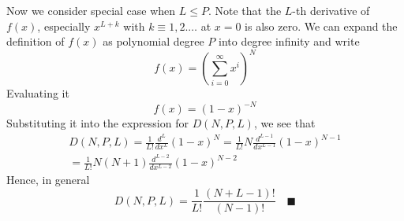 \documentclass[../../main.tex]{subfiles}
\begin{document}
Now we consider special case when $L\leq P$. Note that the $L$-th derivative of $f(x) $, especially $x^{L+k}$ with $k\equiv 1,2.\dots$ at $x=0$ is also zero. We can expand the definition of $f(x)$ as polynomial degree $P$ into degree infinity and write
\begin{equation*}
    f(x)=\left(\sum^{\infty}_{i=0}x^i\right)^N
\end{equation*}
Evaluating it
\begin{equation*}
    f(x)=(1-x)^{-N}
\end{equation*}
Substituting it into the expression for $D(N,P,L)$, we see that 
\begin{multline*}
    D(N,P,L)=\frac{1}{L!}\frac{d^L}{dx^L}(1-x)^N =\frac{1}{L!}N\frac{d^{L-1}}{dx^{L-1}}(1-x)^{N-1}\\ =\frac{1}{L!} N(N+1) \frac{d^{L-2}}{dx^{L-2}}(1-x)^{N-2}
\end{multline*}
Hence, in general
\begin{equation*}
    D(N,P,L)=\frac{1}{L!}\frac{(N+L-1)!}{(N-1)!}\quad \blacksquare
\end{equation*}
\end{document}
